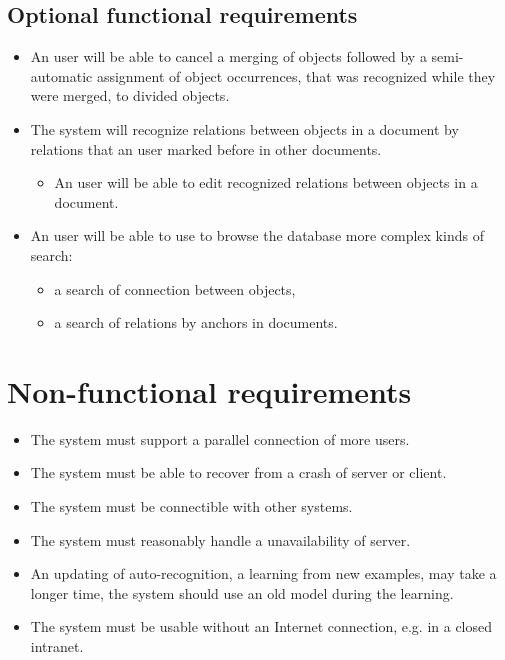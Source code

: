\subsection{Optional functional requirements}
\begin{itemize}
	\item An user will be able to cancel a merging of objects followed by
	a semi-automatic assignment of object occurrences, that was recognized while
	they were merged, to divided objects.
	\item The system will recognize relations between objects in a document by
	relations that an user marked before in other documents.
	\begin{itemize}
		\item An user will be able to edit recognized relations between objects
		in a document.
	\end{itemize}
	\item An user will be able to use to browse the database more complex kinds
	of search:
	\begin{itemize}
		\item a search of connection between objects,
		\item a search of relations by anchors in documents.
	\end{itemize}
\end{itemize}

\section{Non-functional requirements}
\begin{itemize}
	\item The system must support a parallel connection of more users.
	\item The system must be able to recover from a crash of server or client.
	\item The system must be connectible with other systems.
	\item The system must reasonably handle a unavailability of server.
	\item An updating of auto-recognition, a learning from new examples,  may take
	a longer time, the system should use an old model during the learning.
	\item The system must be usable without an Internet connection, e.g. in
	a closed intranet.
\end{itemize}

